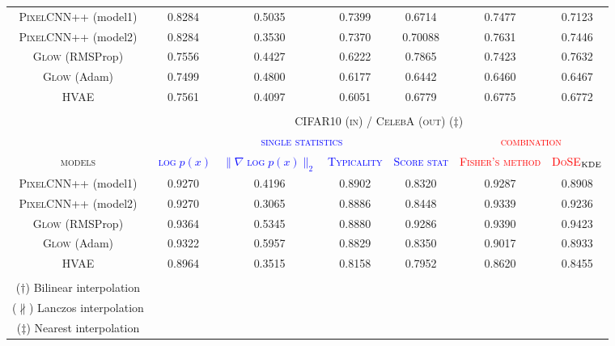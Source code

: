{\begin{table}[tb]
{\begin{tabular}{ccccccc}
            \midrule
            \textsc{PixelCNN++} (model1)  &  0.8284  & 0.5035 & 0.7399 & 0.6714  & 0.7477 & 0.7123 \\
            \textsc{PixelCNN++} (model2) & 0.8284 & 0.3530 &   0.7370 & 0.70088 & 0.7631 & 0.7446\\
            \textsc{Glow} (RMSProp)  & 0.7556 & 0.4427 &  0.6222 & 0.7865  & 0.7423 & 0.7632 \\
            \textsc{Glow} (Adam)   & 0.7499 & 0.4800 &  0.6177 &  0.6442  &  0.6460 &  0.6467 \\
            \textsc{HVAE}  & 0.7561 &   0.4097 & 0.6051 &  0.6779 &  0.6775 &  0.6772  \\
            \bottomrule
             & & & & & & \\
            \toprule
            &\multicolumn{6}{c}{\textsc{CIFAR10 (in) / CelebA (out) ($\ddagger$)}}\\
            \cmidrule{2-7}
            & \multicolumn{4}{c}{\textcolor{blue}{\textsc{single statistics}}} & \multicolumn{2}{c}{\textcolor{red}{\textsc{combination}}}\\
            \cmidrule(r){2-5}\cmidrule(l){6-7}
            \textsc{models}  & \textcolor{blue}{\textsc{$\log p(x)$}} & \textcolor{blue}{\textsc{$\|\nabla \log p(x)\|_2$}} & \textcolor{blue}{\textsc{Typicality}} & \textcolor{blue}{\textsc{Score stat}} & \textcolor{red}{\textsc{Fisher's method}} & \textcolor{red}{\textsc{DoSE$_{\textup{KDE}}$}} \\
            \midrule
            \textsc{PixelCNN++} (model1)  & 0.9270  & 0.4196 & 0.8902 &  0.8320 & 0.9287 &  0.8908 \\
            \textsc{PixelCNN++} (model2) & 0.9270 & 0.3065 & 0.8886 & 0.8448 & 0.9339 & 0.9236 \\
            \textsc{Glow} (RMSProp)  & 0.9364 & 0.5345 &  0.8880 & 0.9286  & 0.9390 & 0.9423 \\
            \textsc{Glow} (Adam)   &  0.9322 & 0.5957 & 0.8829  &  0.8350  & 0.9017 &  0.8933 \\
            \textsc{HVAE}  & 0.8964 & 0.3515  & 0.8158 & 0.7952 &  0.8620 &   0.8455 \\
            \bottomrule
            \vspace{-0.2cm}\\
            ($\dagger$) Bilinear interpolation \\
            \hspace{0.06cm}($\nparallel$) Lanczos interpolation \\
            ($\ddagger$) Nearest interpolation\\
        \end{tabular}
        \label{table:celeba}
    }
\end{table}


}
